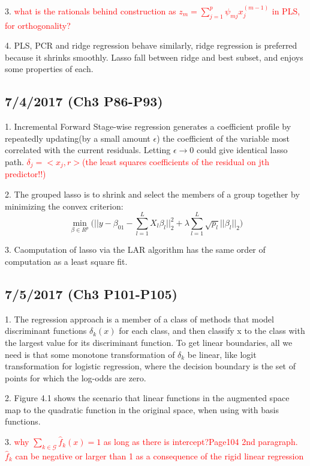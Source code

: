 \documentclass[a4paper, 12pt]{article}
\begin{document}
3. \textcolor{red}{ what is the rationals behind construction as $z_m=\sum_{j=1}^{p}\psi_{mj}x_j^{(m-1)} $ in PLS, for orthogonality?}

4. PLS, PCR and ridge regression behave similarly, ridge regression is preferred because it shrinks smoothly. Lasso fall between ridge and best subset, and enjoys some properties of each.

\subsection*{7/4/2017 (Ch3 P86-P93)}

1. Incremental Forward Stage-wise regression generates a coefficient profile by repeatedly updating(by a small amount $\epsilon$) the coefficient of the variable most correlated with the current residuals. Letting $\epsilon \rightarrow 0$ could give identical lasso path. \textcolor{red}{$\delta_j=<x_j,r>$(the least squares coefficients of the residual on jth predictor!!)}

2. The grouped lasso is to shrink and select the members of a group together by minimizing the convex criterion:$$\displaystyle{\min_{\beta \in R^p}}\Bigg(||y-\beta_01-\sum_{l=1}^{L}X_l\beta_l||_2^2 + \lambda\sum_{l=1}^{L}\sqrt{p_l}||\beta_l||_2\Bigg)$$

3. Caomputation of lasso via the LAR algorithm has the same order of computation as a least square fit.


\subsection*{7/5/2017 (Ch3 P101-P105)}

1. The regression approach is a member of a class of methods that model discriminant functions $\delta_k(x)$ for each class, and then classify x to the class with the largest value for its discriminant function. To get linear boundaries, all we need is that some monotone transformation of $\delta_k$ be linear, like logit transformation for logistic regression, where the decision boundary is the set of points for which the log-odds are zero.

2. Figure 4.1 shows the scenario that linear functions in the augmented space map to the quadratic function in the original space, when using with basis functions.

3. \textcolor{red}{why $\sum_{k \in \mathcal{G}}^{}\hat{f}_k(x)=1$ as long as there is intercept?Page104 2nd paragraph. $\hat{f}_k$ can be negative or larger than 1 as a consequence of the rigid linear regression}
\end{document}
